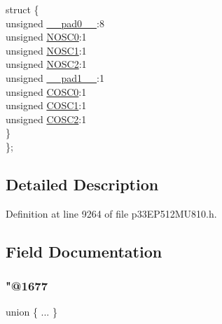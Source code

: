 \begin{DoxyCompactItemize}
\begin{tabbing}
\>struct \{\\
\>\>unsigned \hyperlink{structtag_o_s_c_c_o_n_b_i_t_s_adf71f3d8410c1f1dbbc96680a92c49af}{\_\_pad0\_\_}:8\\
\>\>unsigned \hyperlink{structtag_o_s_c_c_o_n_b_i_t_s_a5663adf507e5eaad1e2a3ca7254561d5}{NOSC0}:1\\
\>\>unsigned \hyperlink{structtag_o_s_c_c_o_n_b_i_t_s_a3fa533f3003798bab77718568958e46b}{NOSC1}:1\\
\>\>unsigned \hyperlink{structtag_o_s_c_c_o_n_b_i_t_s_a19d734695a6e4304c9246eb951ba4804}{NOSC2}:1\\
\>\>unsigned \hyperlink{structtag_o_s_c_c_o_n_b_i_t_s_acaf2d0924a107ec6e8d2e31febaf66f9}{\_\_pad1\_\_}:1\\
\>\>unsigned \hyperlink{structtag_o_s_c_c_o_n_b_i_t_s_a3353a00823936c83e4cfee0a7fe5385d}{COSC0}:1\\
\>\>unsigned \hyperlink{structtag_o_s_c_c_o_n_b_i_t_s_a6bd644cfd4672be0eeb5db65ebd23936}{COSC1}:1\\
\>\>unsigned \hyperlink{structtag_o_s_c_c_o_n_b_i_t_s_aafbfb9e37ee830f1b4c2b80e22b6ccc7}{COSC2}:1\\
\>\} \\
\}; \\

\end{tabbing}\end{DoxyCompactItemize}


\subsection{Detailed Description}


Definition at line 9264 of file p33\+E\+P512\+M\+U810.\+h.



\subsection{Field Documentation}
\mbox{\label{structtag_o_s_c_c_o_n_b_i_t_s_a69c7d85d66ab9dfe0dc5670693206c95}} 
\subsubsection{\texorpdfstring{"@1677}{@1677}}
{\footnotesize\ttfamily union \{ ... \} }

\mbox{\label{structtag_o_s_c_c_o_n_b_i_t_s_adf71f3d8410c1f1dbbc96680a92c49af}} 
